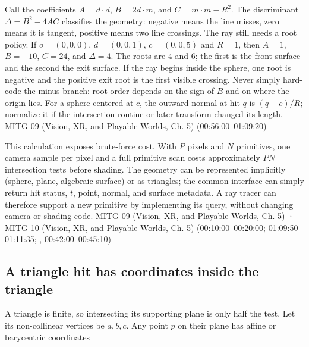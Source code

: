 Call the coefficients \(A=d\cdot d\), \(B=2d\cdot m\), and \(C=m\cdot m-R^2\). The discriminant \(\Delta=B^2-4AC\) classifies the geometry: negative means the line misses, zero means it is tangent, positive means two line crossings. The ray still needs a root policy. If \(o=(0,0,0)\), \(d=(0,0,1)\), \(c=(0,0,5)\) and \(R=1\), then \(A=1\), \(B=-10\), \(C=24\), and \(\Delta=4\). The roots are \(4\) and \(6\); the first is the front surface and the second the exit surface. If the ray begins inside the sphere, one root is negative and the positive exit root is the first visible crossing. Never simply hard-code the minus branch: root order depends on the sign of \(B\) and on where the origin lies. For a sphere centered at \(c\), the outward normal at hit \(q\) is \((q-c)/R\); normalize it if the intersection routine or later transform changed its length. \href{../07-Vision-XR-and-Playable-Worlds/main.pdf\#nameddest=04-visual-computing-ii-ch036-mitg-09---ray-casting}{MITG-09 (Vision, XR, and Playable Worlds, Ch. 5)} (00:56:00--01:09:20)

This calculation exposes brute-force cost. With \(P\) pixels and \(N\) primitives, one camera sample per pixel and a full primitive scan costs approximately \(PN\) intersection tests before shading. The geometry can be represented implicitly (sphere, plane, algebraic surface) or as triangles; the common interface can simply return hit status, \(t\), point, normal, and surface metadata. A ray tracer can therefore support a new primitive by implementing its query, without changing camera or shading code. \href{../07-Vision-XR-and-Playable-Worlds/main.pdf\#nameddest=04-visual-computing-ii-ch036-mitg-09---ray-casting}{MITG-09 (Vision, XR, and Playable Worlds, Ch. 5)} · \href{../07-Vision-XR-and-Playable-Worlds/main.pdf\#nameddest=04-visual-computing-ii-ch036-mitg-10---ray-casting-ii}{MITG-10 (Vision, XR, and Playable Worlds, Ch. 5)} (00:10:00--00:20:00; 01:09:50--01:11:35; , 00:42:00--00:45:10)

\subsection{A triangle hit has coordinates inside the triangle}\label{04-visual-computing-ii-ch028-a-triangle-hit-has-coordinates-inside-the-triangle}

A triangle is finite, so intersecting its supporting plane is only half the test. Let its non-collinear vertices be \(a,b,c\). Any point \(p\) on their plane has affine or barycentric coordinates

